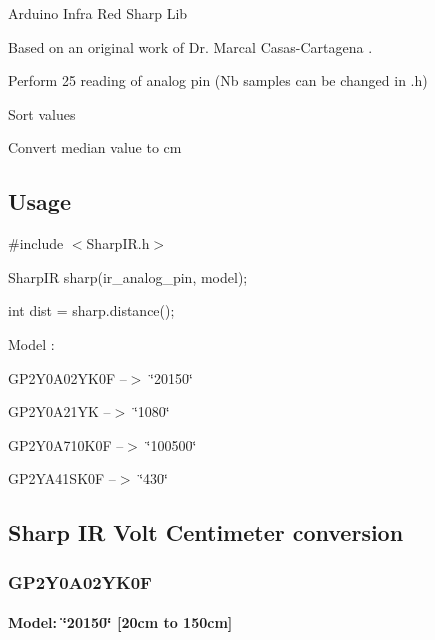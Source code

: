 Arduino Infra Red Sharp Lib

Based on an original work of Dr. Marcal Casas-\/\+Cartagena .


\begin{DoxyEnumerate}
\item Perform 25 reading of analog pin (Nb samples can be changed in .h)
\item Sort values
\item Convert median value to cm
\end{DoxyEnumerate}

\subsection*{Usage}


\begin{DoxyItemize}
\item \#include $<$Sharp\+I\+R.\+h$>$
\item Sharp\+IR sharp(ir\+\_\+analog\+\_\+pin, model);
\item int dist = sharp.\+distance();
\end{DoxyItemize}

Model \+:
\begin{DoxyItemize}
\item G\+P2\+Y0\+A02\+Y\+K0F --$>$ \char`\"{}20150\char`\"{}
\item G\+P2\+Y0\+A21\+YK --$>$ \char`\"{}1080\char`\"{}
\item G\+P2\+Y0\+A710\+K0F --$>$ \char`\"{}100500\char`\"{}
\item G\+P2\+Y\+A41\+S\+K0F --$>$ \char`\"{}430\char`\"{}
\end{DoxyItemize}

\subsection*{Sharp IR Volt Centimeter conversion}

\subsubsection*{G\+P2\+Y0\+A02\+Y\+K0F}

\paragraph*{Model\+: \char`\"{}20150\char`\"{} \mbox{[}20cm to 150cm\mbox{]}}

